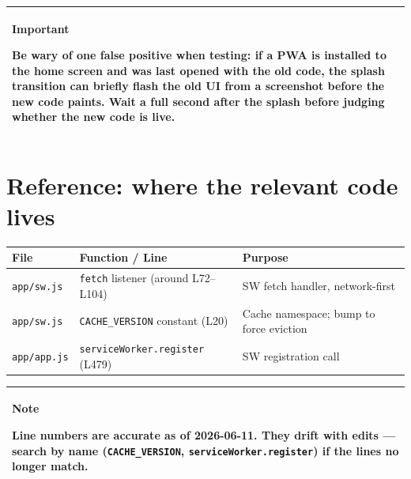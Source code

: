 \documentclass[11pt,a4paper]{article}
\newcommand{\callout}[3]{%
  \begin{center}%
  \begin{tabularx}{\linewidth}{|>{\columncolor{#1}}X|}%
  \hline
  \textbf{#2}\par\smallskip #3\\[2pt]
  \hline
  \end{tabularx}%
  \end{center}%
}
\newcommand{\notebox}[1]{\callout{notebg}{Note}{#1}}
\newcommand{\warnbox}[1]{\callout{warnbg}{Important}{#1}}
\begin{document}
\warnbox{Be wary of one false positive when testing: if a PWA is installed to the home screen and was last opened with the old code, the splash transition can briefly flash the old UI from a screenshot before the new code paints. Wait a full second after the splash before judging whether the new code is live.}

\section{Reference: where the relevant code lives}

\begin{center}
\small
\begin{tabular}{lll}
\textbf{File} & \textbf{Function / Line} & \textbf{Purpose} \\ \hline
\texttt{app/sw.js}  & \texttt{fetch} listener (around L72--L104) & SW fetch handler, network-first \\
\texttt{app/sw.js}  & \texttt{CACHE\_VERSION} constant (L20)      & Cache namespace; bump to force eviction \\
\texttt{app/app.js} & \texttt{serviceWorker.register} (L479)      & SW registration call \\
\end{tabular}
\end{center}

\notebox{Line numbers are accurate as of 2026-06-11. They drift with edits --- search by name (\texttt{CACHE\_VERSION}, \texttt{serviceWorker.register}) if the lines no longer match.}
\end{document}
